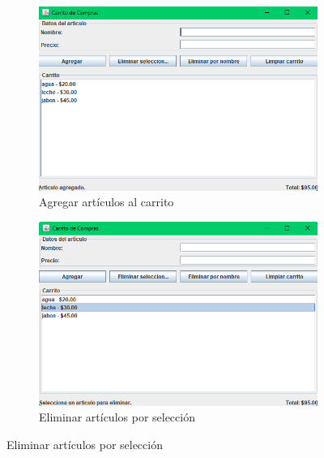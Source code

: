 \documentclass[letterpaper,12pt]{article}
\begin{document}
\begin{figure}[H]
    \centering
    \begin{subfigure}{0.45\textwidth}
        \centering
        \includegraphics[width=\linewidth]{Imagenes/agregar.png}
        \caption*{Agregar artículos al carrito}
    \end{subfigure}
    \hfill
    \begin{subfigure}{0.45\textwidth}
        \centering
        \includegraphics[width=\linewidth]{Imagenes/seleccion.png}
        \caption*{Eliminar artículos por selección}
    \end{subfigure}
\end{figure}
\end{document}
